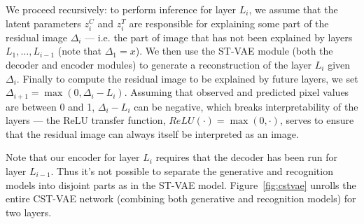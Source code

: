 We proceed recursively: to perform inference for  layer $L_i$, we assume that the latent parameters $z^C_i$ and $z^T_i$ are responsible for explaining
some part of the residual image $\Delta_i$ --- i.e. the part of image that has not been explained by layers $L_1, \dots, L_{i-1}$ (note that $\Delta_1=x$).
We then use the ST-VAE module (both the decoder and encoder modules) 
to generate a reconstruction of the layer $L_i$ given $\Delta_i$.  Finally to compute the residual image to be explained by future layers, we set
$\Delta_{i+1} = \max (0, \Delta_i - L_i)$.  Assuming that observed and predicted pixel values are between 0 and 1, $\Delta_i-L_i$ can be negative, which breaks interpretability of the layers --- the ReLU transfer function, $ReLU(\cdot)=\max(0, \cdot)$, serves to ensure that the residual image can always itself be interpreted as an image.

Note that our encoder for layer $L_i$ requires that the decoder has been run for layer $L_{i-1}$.  Thus it's not possible to separate the generative
and recognition models into disjoint parts as in the ST-VAE model.  Figure~\ref{fig:cstvae} unrolls the entire CST-VAE network (combining
both generative and recognition models) for two layers.











